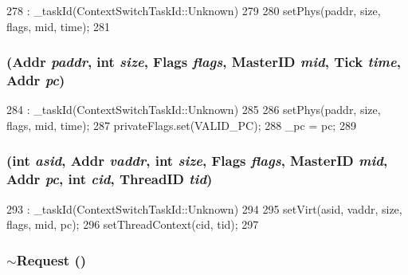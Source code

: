 \begin{DoxyCode}
278         : _taskId(ContextSwitchTaskId::Unknown)
279     {
280         setPhys(paddr, size, flags, mid, time);
281     }
\end{DoxyCode}
\hypertarget{classRequest_a8882f6e806e0cdfac904bffddae2a868}{
\subsubsection[{Request}]{ ({\bf Addr} {\em paddr}, \/  int {\em size}, \/  {\bf Flags} {\em flags}, \/  {\bf MasterID} {\em mid}, \/  {\bf Tick} {\em time}, \/  {\bf Addr} {\em pc})}}
\label{classRequest_a8882f6e806e0cdfac904bffddae2a868}



\begin{DoxyCode}
284         : _taskId(ContextSwitchTaskId::Unknown)
285     {
286         setPhys(paddr, size, flags, mid, time);
287         privateFlags.set(VALID_PC);
288         _pc = pc;
289     }
\end{DoxyCode}
\hypertarget{classRequest_a82ca26c8ef204239a4c4204f7319b4ec}{
\subsubsection[{Request}]{ (int {\em asid}, \/  {\bf Addr} {\em vaddr}, \/  int {\em size}, \/  {\bf Flags} {\em flags}, \/  {\bf MasterID} {\em mid}, \/  {\bf Addr} {\em pc}, \/  int {\em cid}, \/  {\bf ThreadID} {\em tid})}}
\label{classRequest_a82ca26c8ef204239a4c4204f7319b4ec}



\begin{DoxyCode}
293         : _taskId(ContextSwitchTaskId::Unknown)
294     {
295         setVirt(asid, vaddr, size, flags, mid, pc);
296         setThreadContext(cid, tid);
297     }
\end{DoxyCode}
\hypertarget{classRequest_ab4e418b7b4be8c3243b478b09f10d3ed}{
\subsubsection[{$\sim$Request}]{\setlength{\rightskip}{0pt plus 5cm}$\sim${\bf Request} ()}}
\label{classRequest_ab4e418b7b4be8c3243b478b09f10d3ed}



